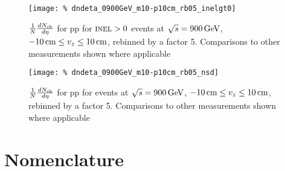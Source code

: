 \documentclass[11pt]{article}
\def\AlwaysText#1{\ifmmode\relax\text{#1}\else #1\fi}
\newcommand{\AbbrName}[1]{\AlwaysText{{\scshape #1}}}
\newcommand{\INELONE}{$\AbbrName{inel}>0$}
\newcommand{\NSD}{\AbbrName{nsd}}
\newcommand{\mult}[1][]{\ensuremath N_{\text{ch}#1}}
\newcommand{\dndeta}[1][]{{\ensuremath%
    \ifx|#1|\else\left.\fi%
    \frac{1}{N}\frac{d\mult{}}{d\eta}%
    \ifx|#1|\else\right|_{#1}\fi%
}}
\newcommand{\GeV}[1]{\unit[#1]{\AlwaysText{GeV}}}
\newcommand{\cm}[1]{\unit[#1]{\AlwaysText{cm}}}
\begin{document}
\begin{figure}[tbp]
  \centering
  \texttt{[image: \%
    dndeta\_0900GeV\_m10-p10cm\_rb05\_inelgt0]}
  \caption{$\dndeta$ for pp for \INELONE{} events at
    $\sqrt{s}=\GeV{900}$, $\cm{-10}\le v_z\le\cm{10}$, rebinned by a
    factor 5.  Comparisons to other measurements shown where
    applicable}
  \label{fig:2}
\end{figure} 
\begin{figure}[tbp]
  \centering
  \texttt{[image: \%
    dndeta\_0900GeV\_m10-p10cm\_rb05\_nsd]}
  \caption{$\dndeta$ for pp for \NSD{} events at $\sqrt{s}=\GeV{900}$,
    $\cm{-10}\le v_z\le\cm{10}$, rebinned by a factor 5.  Comparisons
    to other measurements shown where applicable}
  \label{fig:3}
\end{figure} 
\fi

\clearpage
\appendix 
\section{Nomenclature} 
\label{app:nomen}
\end{document}
